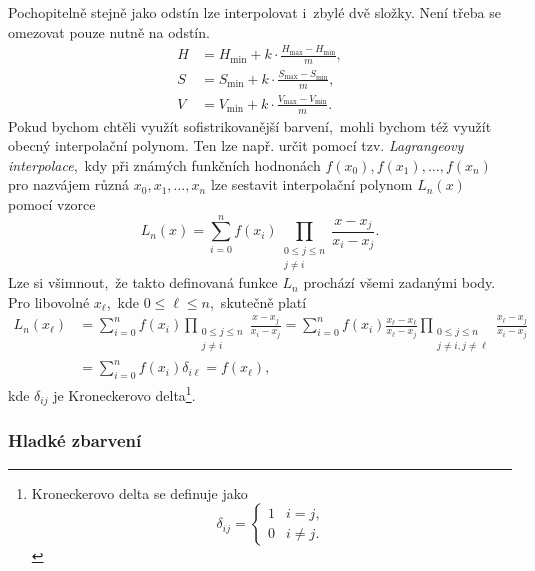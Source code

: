 Pochopitelně stejně jako odstín lze interpolovat i~zbylé dvě složky. Není třeba se omezovat pouze nutně na odstín.
\begin{align*}
    H&=H_{\text{min}}+k\cdot\frac{H_{\text{max}}-H_{\text{min}}}{m},\\
    S&=S_{\text{min}}+k\cdot\frac{S_{\text{max}}-S_{\text{min}}}{m},\\
    V&=V_{\text{min}}+k\cdot\frac{V_{\text{max}}-V_{\text{min}}}{m}.
\end{align*}
Pokud bychom chtěli využít sofistrikovanější barvení,~mohli bychom též využít obecný interpolační polynom. Ten lze např. určit pomocí tzv. \emph{Lagrangeovy interpolace},~kdy při známých funkčních hodnonách $f(x_0),f(x_1),\ldots,f(x_n)$ pro nazvájem různá $x_0,x_1,\ldots,x_n$ lze sestavit interpolační polynom $L_n(x)$ pomocí vzorce
\[L_n(x)=\sum_{i=0}^{n}f(x_i)\prod_{\substack{0\leqslant j\leqslant n\\j\neq i}}{\frac {x-x_{j}}{x_{i}-x_{j}}}.\]
Lze si všimnout,~že takto definovaná funkce $L_n$ prochází všemi zadanými body. Pro libovolné $x_\ell$,~kde $0\leqslant\ell\leqslant n$,~skutečně platí
\begin{align*}
    L_n(x_\ell)&=\sum_{i=0}^{n}f(x_i)\prod_{\substack{0\leqslant j\leqslant n\\j\neq i}}{\frac {x-x_{j}}{x_{i}-x_{j}}}=\sum_{i=0}^{n}f(x_i)\frac{x_\ell-x_\ell}{x_{\ell}-x_{j}}\prod_{\substack{0\leqslant j\leqslant n\\j\neq i,j\neq\ell}}{\frac {x_\ell-x_{j}}{x_{i}-x_{j}}}\\
    &=\sum_{i=0}^{n}f(x_i)\delta_{i\ell}=f(x_\ell),
\end{align*}
kde $\delta_{ij}$ je Kroneckerovo delta\footnote{Kroneckerovo delta se definuje jako
\[\delta_{ij}=\begin{cases}
    1 & i=j,\\
    0 & i\neq j.
\end{cases}\]
}.

\subsubsection{Hladké zbarvení}

